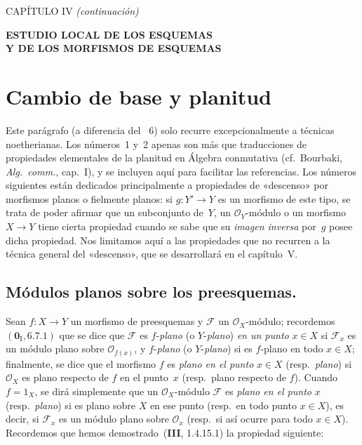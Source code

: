 \clearpage
\thispagestyle{plain}
\label{chapter:IV2-fr}

\begin{center}
{\large CAPÍTULO IV \textit{(continuación)}\par}
\vspace{1.5em}
{\Large\bfseries ESTUDIO LOCAL DE LOS ESQUEMAS\\
Y DE LOS MORFISMOS DE ESQUEMAS\par}
\end{center}

\setcounter{section}{1}
\section{Cambio de base y planitud}
\label{section:IV.2-fr}

Este parágrafo (a diferencia del \textsection~6) solo recurre excepcionalmente a técnicas noetherianas.
Los números~1 y~2 apenas son más que traducciones de propiedades elementales de la planitud en Álgebra conmutativa (cf.~Bourbaki, \emph{Alg.~comm.}, cap.~I), y se incluyen aquí para facilitar las referencias.
Los números siguientes están dedicados principalmente a propiedades de «descenso» por morfismos planos o fielmente planos: si $g:Y'\to Y$ es un morfismo de este tipo, se trata de poder afirmar que un subconjunto de~$Y$, un $\mathcal O_Y$-módulo o un morfismo $X\to Y$ tiene cierta propiedad cuando se sabe que su \emph{imagen inversa} por~$g$ posee dicha propiedad.
Nos limitamos aquí a las propiedades que no recurren a la técnica general del «descenso», que se desarrollará en el capítulo~V.

\setcounter{subsection}{0}
\subsection{Módulos planos sobre los preesquemas.}
\label{subsection:IV.2.1-fr}

\begin{env}[2.1.1]
Sean $f:X\to Y$ un morfismo de preesquemas y $\mathscr F$ un $\mathcal O_X$-módulo;
recordemos~$(\mathbf{0}_{\mathrm I},6.7.1)$ que se dice que $\mathscr F$ es $f$-\emph{plano} (o $Y$-\emph{plano}) \emph{en un punto} $x\in X$ si $\mathscr F_x$ es un módulo plano sobre $\mathcal O_{f(x)}$, y $f$-\emph{plano} (o $Y$-\emph{plano}) si es $f$-plano en todo $x\in X$; finalmente, se dice que el morfismo $f$ es \emph{plano en el punto} $x\in X$ (resp.\ \emph{plano}) si $\mathcal O_X$ es plano respecto de $f$ en el punto~$x$ (resp.\ plano respecto de $f$).
Cuando $f=1_X$, se dirá simplemente que un $\mathcal O_X$-módulo $\mathscr F$ es \emph{plano en el punto} $x$ (resp.\ \emph{plano}) si es plano sobre $X$ en ese punto (resp.\ en todo punto $x\in X$), es decir, si $\mathscr F_x$ es un módulo plano sobre $\mathcal O_x$ (resp.\ si así ocurre para todo $x\in X$).
Recordemos que hemos demostrado~(\textbf{III}, 1.4.15.1) la propiedad siguiente:
\end{env}

